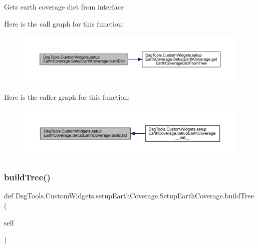 \begin{DoxyVerb}Gets earth coverage dict from interface
\end{DoxyVerb}
 Here is the call graph for this function\+:
\nopagebreak
\begin{figure}[H]
\begin{center}
\leavevmode
\includegraphics[width=350pt]{class_dsg_tools_1_1_custom_widgets_1_1setup_earth_coverage_1_1_setup_earth_coverage_a9b14ae2d6974612eca27a3771d653146_cgraph}
\end{center}
\end{figure}
Here is the caller graph for this function\+:
\nopagebreak
\begin{figure}[H]
\begin{center}
\leavevmode
\includegraphics[width=350pt]{class_dsg_tools_1_1_custom_widgets_1_1setup_earth_coverage_1_1_setup_earth_coverage_a9b14ae2d6974612eca27a3771d653146_icgraph}
\end{center}
\end{figure}
\mbox{\label{class_dsg_tools_1_1_custom_widgets_1_1setup_earth_coverage_1_1_setup_earth_coverage_aafb31efcb7b91af542b4f9ac3b393855}} 
\subsubsection{\texorpdfstring{build\+Tree()}{buildTree()}}
{\footnotesize\ttfamily def Dsg\+Tools.\+Custom\+Widgets.\+setup\+Earth\+Coverage.\+Setup\+Earth\+Coverage.\+build\+Tree (\begin{DoxyParamCaption}\item[{}]{self }\end{DoxyParamCaption})}

